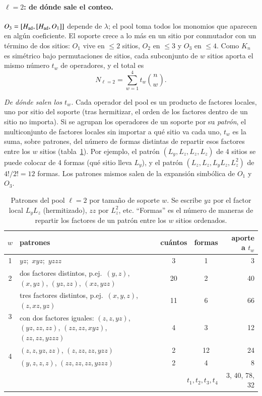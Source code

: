 \documentclass[11pt,a4paper]{article}
\begin{document}
\paragraph{$\ell=2$: de dónde sale el conteo.}
$O_3=[H_{\rm ad},[H_{\rm ad},O_1]]$ depende de $\lambda$; el pool toma todos los monomios que
aparecen en algún coeficiente. El soporte crece a lo más en un sitio por conmutador con un
término de dos sitios: $O_1$ vive en $\leq2$ sitios, $O_2$ en $\leq3$ y $O_3$ en $\leq4$. Como
$K_n$ es simétrico bajo permutaciones de sitios, cada subconjunto de $w$ sitios aporta el mismo
número $t_w$ de operadores, y el total es
\begin{equation}
  N_{\ell=2}=\sum_{w=1}^{4}t_w\binom nw .
\end{equation}

\emph{De dónde salen los $t_w$.} Cada operador del pool es un producto de factores locales, uno por
sitio del soporte (tras hermitizar, el orden de los factores dentro de un sitio no importa). Si se
agrupan los operadores de un soporte por su \emph{patrón}, el multiconjunto de factores locales sin
importar a qué sitio va cada uno, $t_w$ es la suma, sobre patrones, del número de formas distintas
de repartir esos factores entre los $w$ sitios (tabla~\ref{tab:tiposl2}). Por ejemplo, el patrón
$(L_y,L_z,L_z,L_z)$ de 4 sitios se puede colocar de 4 formas (qué sitio lleva $L_y$), y el patrón
$(L_z,L_z,L_yL_z,L_z^2)$ de $4!/2!=12$ formas. Los patrones mismos salen de la expansión
simbólica de $O_1$ y $O_3$.

\begin{table}[h]
\centering
\caption{Patrones del pool $\ell=2$ por tamaño de soporte $w$. Se escribe $yz$ por el factor local
$L_yL_z$ (hermitizado), $zz$ por $L_z^2$, etc. ``Formas'' es el número de maneras de repartir los
factores de un patrón entre los $w$ sitios ordenados.}
\label{tab:tiposl2}
\small
\begin{tabular}{clccr}
\toprule
$w$ & patrones & cuántos & formas & aporte a $t_w$ \\
\midrule
1 & $yz$;\ $xyz$;\ $yzzz$ & 3 & 1 & 3 \\
\midrule
2 & dos factores distintos, p.ej.\ $(y,z)$, $(x,yz)$, $(yz,zz)$, $(xz,yzz)$ & 20 & 2 & 40 \\
\midrule
\multirow{2}{*}{3} & tres factores distintos, p.ej.\ $(x,y,z)$, $(z,xz,yz)$ & 11 & 6 & 66 \\
 & con dos factores iguales: $(z,z,yz)$, $(yz,zz,zz)$, $(zz,zz,xyz)$, $(zz,zz,yzzz)$ & 4 & 3 & 12 \\
\midrule
\multirow{2}{*}{4} & $(z,z,yz,zz)$, $(z,zz,zz,yzz)$ & 2 & 12 & 24 \\
 & $(y,z,z,z)$, $(zz,zz,zz,yzzz)$ & 2 & 4 & 8 \\
\midrule
 & \multicolumn{3}{r}{$t_1,t_2,t_3,t_4$} & 3, 40, 78, 32 \\
\bottomrule
\end{tabular}
\end{table}
\end{document}
